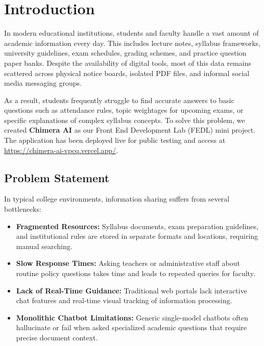\chapter{Introduction}

In modern educational institutions, students and faculty handle a vast amount of academic information every day. This includes lecture notes, syllabus frameworks, university guidelines, exam schedules, grading schemes, and practice question paper banks. Despite the availability of digital tools, most of this data remains scattered across physical notice boards, isolated PDF files, and informal social media messaging groups.

As a result, students frequently struggle to find accurate answers to basic questions such as attendance rules, topic weightages for upcoming exams, or specific explanations of complex syllabus concepts. To solve this problem, we created \textbf{Chimera AI} as our Front End Development Lab (FEDL) mini project. The application has been deployed live for public testing and access at \url{https://chimera-ai-vpcq.vercel.app/}.

\section{Problem Statement}
In typical college environments, information sharing suffers from several bottlenecks:
\begin{itemize}
    \item \textbf{Fragmented Resources:} Syllabus documents, exam preparation guidelines, and institutional rules are stored in separate formats and locations, requiring manual searching.
    \item \textbf{Slow Response Times:} Asking teachers or administrative staff about routine policy questions takes time and leads to repeated queries for faculty.
    \item \textbf{Lack of Real-Time Guidance:} Traditional web portals lack interactive chat features and real-time visual tracking of information processing.
    \item \textbf{Monolithic Chatbot Limitations:} Generic single-model chatbots often hallucinate or fail when asked specialized academic questions that require precise document context.
\end{itemize}

